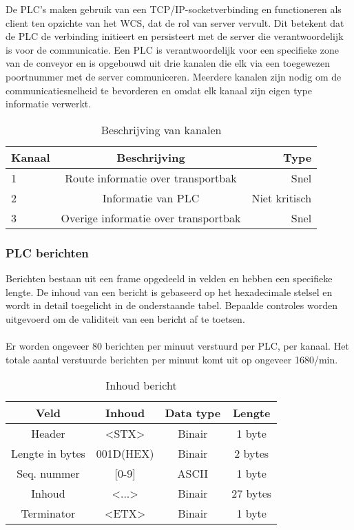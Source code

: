 De PLC's maken gebruik van een TCP/IP-socketverbinding en functioneren als client ten opzichte van het WCS, dat de rol van server vervult. 
Dit betekent dat de PLC de verbinding initieert en persisteert met de server die verantwoordelijk is voor de communicatie.
Een PLC is verantwoordelijk voor een specifieke zone van de conveyor en is opgebouwd uit drie kanalen die elk via een toegewezen poortnummer met de server communiceren. 
Meerdere kanalen zijn nodig om de communicatiesnelheid te bevorderen en omdat elk kanaal zijn eigen type informatie verwerkt.

\begin{table}[!h]
    \centering
    \begin{tabular}{lcr}
      \toprule
      \textbf{Kanaal} & \textbf{Beschrijving} & \textbf{Type}                \\
      \midrule
      1                & Route informatie over transportbak          & Snel           \\
      2                & Informatie van PLC                          & Niet kritisch  \\
      3                & Overige informatie over transportbak        & Snel           \\
      \bottomrule
    \end{tabular}
    \caption[Channel assignment]{\label{tab:channel-assignment}Beschrijving van kanalen}
  \end{table}
 
\subsubsection{PLC berichten}
Berichten bestaan uit een frame opgedeeld in velden en hebben een specifieke lengte.
De inhoud van een bericht is gebaseerd op het hexadecimale stelsel en wordt in detail toegelicht in de onderstaande tabel.
Bepaalde controles worden uitgevoerd om de validiteit van een bericht af te toetsen. 
\\\\
Er worden ongeveer 80 berichten per minuut verstuurd per PLC, per kanaal.
Het totale aantal verstuurde berichten per minuut komt uit op ongeveer 1680/min.

\begin{table}[h!]
  \centering 
  \begin{tabular}{|c|c|c|c|}
    \hline
    \textbf{Veld} & \textbf{Inhoud} & \textbf{Data type} & \textbf{Lengte} \\
    \hline 
    Header & <STX> & Binair & 1 byte \\
    \hline 
    Lengte in bytes & 001D(HEX) & Binair & 2 bytes \\
    \hline 
    Seq. nummer &  [0-9] & ASCII & 1 byte  \\
    \hline 
    Inhoud & <...> & Binair & 27 bytes \\
    \hline 
    Terminator & <ETX> & Binair & 1 byte \\
    \hline
  \end{tabular}
  \caption[Message content]{\label{tab:message-content}Inhoud bericht}
\end{table}

